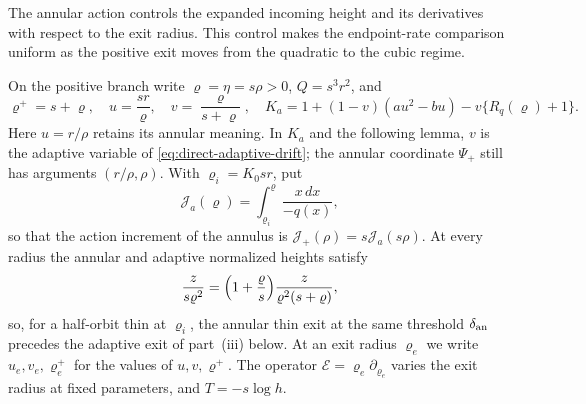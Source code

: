 The annular action controls the expanded incoming height and its
derivatives with respect to the exit radius. This control makes the
endpoint-rate comparison uniform as the positive exit moves from the
quadratic to the cubic regime.

On the positive branch write \(\varrho=\eta=s\rho>0\), \(Q=s^3r^2\), and
\begin{equation}
\label{eq:positive-adaptive-variables}
 \varrho^+=s+\varrho,\quad u=\frac{sr}\varrho,\quad
 v=\frac\varrho{s+\varrho},\quad
 K_a=1+(1-v)(au^2-bu)-v\{R_q(\varrho)+1\}.
\end{equation}
Here \(u=r/\rho\) retains its annular meaning. In \(K_a\) and the following
lemma, \(v\) is the adaptive variable of
\eqref{eq:direct-adaptive-drift}; the annular coordinate
\(\Psi_+\) still has arguments \((r/\rho,\rho)\). With
\(\varrho_i=K_0sr\), put
\[
 \mathcal J_a(\varrho)=\int_{\varrho_i}^{\varrho}\frac{x\,dx}{-q(x)},
\]
so that the action increment of the annulus is \(\mathcal J_+(\rho)=s\mathcal J_a(s\rho)\).
At every radius the annular and adaptive normalized heights satisfy
\begin{equation}
\label{eq:positive-annular-adaptive-heights}
 \frac{z}{s\varrho^2}
   =\Bigl(1+\frac\varrho s\Bigr)\frac{z}{\varrho^2(s+\varrho)} ,
\end{equation}
so, for a half-orbit thin at \(\varrho_i\), the annular thin exit at the
same threshold \(\delta_{\rm an}\) precedes the adaptive exit of part~(iii)
below.
At an exit radius \(\varrho_e\) we write \(u_e,v_e,\varrho_e^+\) for the
values of \(u,v,\varrho^+\). The operator
\(\mathcal E=\varrho_e\partial_{\varrho_e}\) varies the exit radius at fixed
parameters, and \(T=-s\log h\).

